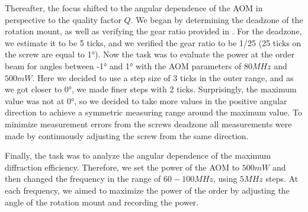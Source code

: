 Thereafter, the focus shifted to the angular dependence of the AOM in perspective to the quality factor $Q$. We began by determining the deadzone of the rotation mount, as well as verifying the gear ratio provided in \autocite{Drehtisch}. For the deadzone, we estimate it to be 5 ticks, and we verified the gear ratio to be 1/25 (25 ticks on the screw are equal to \ang{1}). Now the task was to evaluate the power at the  order beam for angles between -\ang{1} and \ang{1} with the AOM parameters of $80 \unit{MHz}$ and $500 \unit{mW}$. Here we decided to use a step size of 3 ticks in the outer range, and as we got closer to \ang{0}, we made finer steps with 2 ticks. Surprisingly, the maximum value was not at \ang{0}, so we decided to take more values in the positive angular direction to achieve a symmetric measuring range around the maximum value. To minimize measurement errors from the screws deadzone all measurements were made by continuously adjusting the screw from the same direction. 

Finally, the task was to analyze the angular dependence of the maximum diffraction efficiency. Therefore, we set the power of the AOM to $500 \unit{mW}$ and then changed the frequency in the range of $60 - 100 \unit{MHz}$, using $5 \unit{MHz}$ steps. At each frequency, we aimed to maximize the power of the  order by adjusting the angle of the rotation mount and recording the power.



